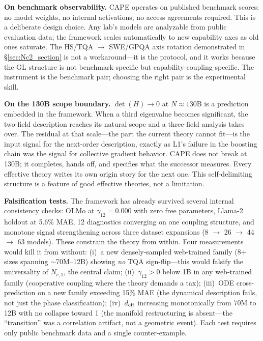 \documentclass[11pt]{article}
\begin{document}
\textbf{On benchmark observability.}
CAPE operates on published benchmark scores: no model weights, no internal activations, no access agreements required.
This is a deliberate design choice.
Any lab's models are analyzable from public evaluation data; the framework scales automatically to new capability axes as old ones saturate.
The HS/TQA $\to$ SWE/GPQA axis rotation demonstrated in \S\ref{sec:Nc2_section} is not a workaround---it is the protocol, and it works because the GL structure is not benchmark-specific but capability-coupling-specific.
The instrument is the benchmark pair; choosing the right pair is the experimental skill.

\textbf{On the 130B scope boundary.}
$\det(H) \to 0$ at $N \approx 130$B is a prediction embedded in the framework.
When a third eigenvalue becomes significant, the two-field description reaches its natural scope and a three-field analysis takes over.
The residual at that scale---the part the current theory cannot fit---is the input signal for the next-order description, exactly as L1's failure in the boosting chain was the signal for collective gradient behavior.
CAPE does not break at 130B; it completes, hands off, and specifies what the successor measures.
Every effective theory writes its own origin story for the next one.
This self-delimiting structure is a feature of good effective theories, not a limitation.

\textbf{Falsification tests.}
The framework has already survived several internal consistency checks: OLMo at $\gamma_{12}=0.000$ with zero free parameters, Llama-2 holdout at 5.6\% MAE, 12 diagnostics converging on one coupling structure, and monotone signal strengthening across three dataset expansions (8 $\to$ 26 $\to$ 44 $\to$ 63 models).
These constrain the theory from within.
Four measurements would kill it from without:
(i)~a new densely-sampled web-trained family (8+ sizes spanning $\sim$70M--12B) showing \emph{no} TQA sign-flip---this would falsify the universality of $N_{c,1}$, the central claim;
(ii)~$\gamma_{12} > 0$ below 1B in any web-trained family (cooperative coupling where the theory demands a tax);
(iii)~ODE cross-prediction on a new family exceeding 15\% MAE (the dynamical description fails, not just the phase classification);
(iv)~$d_{\rm eff}$ increasing monotonically from 70M to 12B with no collapse toward 1 (the manifold restructuring is absent---the ``transition'' was a correlation artifact, not a geometric event).
Each test requires only public benchmark data and a single counter-example.
\end{document}
